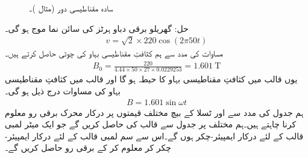 \begin{figure}
\centering
{}%
\caption{سادہ مقناطیسی دور (مثال )۔}
\label{شکل_مقناطیسی__سادہ_مقناطیسی_دور_بغیر_درز_دوبارہ}
\end{figure}
حل:\quad
گھریلو برقی دباو  ہرٹز کی سائن نما موج ہو گی۔
\begin{align}
v=\sqrt{2} \times 220 \cos (2 \pi  50 t)
\end{align}
مساوات   کی مدد سے ہم کثافتِ مقناطیسی بہاو کی چوٹی حاصل کرتے ہیں۔
\begin{align}
B_0=\frac{220}{4.44 \times 50 \times 27 \times 0.0229253}=\SI{1.601}{\tesla}
\end{align}
یوں قالب میں کثافتِ مقناطیسی بہاو کا حیطہ    ہو گا اور   قالب میں کثافتِ مقناطیسی بہاو کی مساوات درج ذیل ہو گی۔
\begin{align}\label{مساوات_مقناطیسی_دور_سائن_نما_کثافت_بہاو}
B=1.601 \sin \omega t
\end{align}
ہم جدول کی مدد سے    اور  ٹسلا کے بیچ  مختلف قیمتوں پر درکار محرک برقی رو  معلوم کرنا چاہتے ہیں۔ہم مختلف  پر جدول  سے قالب کی  حاصل کریں گے جو  ایک میٹر لمبی قالب کے لئے درکار ایمپیئر-چکر ہوں گے۔اس سے  سم لمبی قالب کے لئے درکار ایمپیئر-چکر   کر معلوم کر کے برقی رو حاصل کریں گے۔


